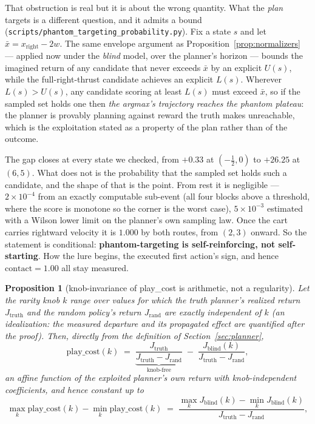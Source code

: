 \documentclass[11pt]{article}
\newtheorem{proposition}{Proposition}
\theoremstyle{definition}
\theoremstyle{remark}
\begin{document}
That obstruction is real but it is about the wrong quantity. What the \emph{plan} targets is a different question, and it admits a bound (\texttt{scripts/\allowbreak phantom\_\allowbreak targeting\_\allowbreak probability.py}). Fix a state $s$ and let $\bar x = x_\mathrm{right} - 2w$. The same envelope argument as Proposition~\ref{prop:normalizers} --- applied now under the \emph{blind} model, over the planner's horizon --- bounds the imagined return of any candidate that never exceeds $\bar x$ by an explicit $U(s)$, while the full-right-thrust candidate achieves an explicit $L(s)$. Wherever $L(s) > U(s)$, any candidate scoring at least $L(s)$ must exceed $\bar x$, so if the sampled set holds one then \emph{the argmax's trajectory reaches the phantom plateau}: the planner is provably planning against reward the truth makes unreachable, which is the exploitation stated as a property of the plan rather than of the outcome.

The gap closes at every state we checked, from $+0.33$ at $(-\tfrac12, 0)$ to $+26.25$ at $(6,5)$. What does not is the probability that the sampled set holds such a candidate, and the shape of that is the point. From rest it is negligible --- $2\times10^{-4}$ from an exactly computable sub-event (all four blocks above a threshold, where the score is monotone so the corner is the worst case), $5\times10^{-3}$ estimated with a Wilson lower limit on the planner's own sampling law. Once the cart carries rightward velocity it is $1.000$ by both routes, from $(2,3)$ onward. So the statement is conditional: \textbf{phantom-targeting is self-reinforcing, not self-starting}. How the lure begins, the executed first action's sign, and hence $\mathrm{contact} = 1.00$ all stay measured.

\begin{proposition}[knob-invariance of play\_cost is arithmetic, not a regularity]
\label{prop:knobinv}
Let the rarity knob $k$ range over values for which the truth planner's realized return $J_{\mathrm{truth}}$ and the random policy's return $J_{\mathrm{rand}}$ are \emph{exactly} independent of $k$ (an idealization: the measured departure and its propagated effect are quantified after the proof). Then, directly from the definition of Section~\ref{sec:planner},
\[
  \mathrm{play\_cost}(k) \;=\; \underbrace{\frac{J_{\mathrm{truth}}}{J_{\mathrm{truth}} - J_{\mathrm{rand}}}}_{\text{knob-free}} \;-\; \frac{J_{\mathrm{blind}}(k)}{J_{\mathrm{truth}} - J_{\mathrm{rand}}},
\]
an affine function of the exploited planner's own return with knob-independent coefficients, and hence constant up to
\[
  \max_k \mathrm{play\_cost}(k) - \min_k \mathrm{play\_cost}(k) \;=\; \frac{\max_k J_{\mathrm{blind}}(k) - \min_k J_{\mathrm{blind}}(k)}{J_{\mathrm{truth}} - J_{\mathrm{rand}}},
\]
\end{proposition}
\end{document}

